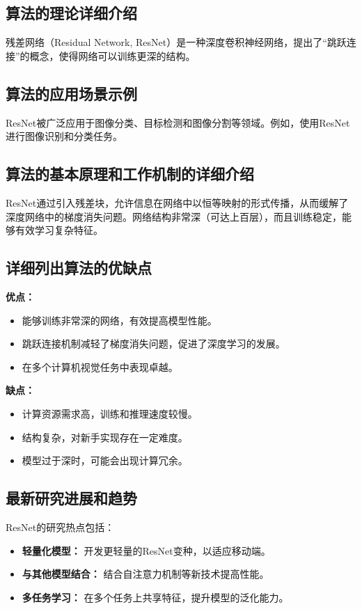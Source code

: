 \subsection*{算法的理论详细介绍}
残差网络（Residual Network, ResNet）是一种深度卷积神经网络，提出了“跳跃连接”的概念，使得网络可以训练更深的结构。

\subsection*{算法的应用场景示例}
ResNet被广泛应用于图像分类、目标检测和图像分割等领域。例如，使用ResNet进行图像识别和分类任务。

\subsection*{算法的基本原理和工作机制的详细介绍}
ResNet通过引入残差块，允许信息在网络中以恒等映射的形式传播，从而缓解了深度网络中的梯度消失问题。网络结构非常深（可达上百层），而且训练稳定，能够有效学习复杂特征。

\subsection*{详细列出算法的优缺点}
\textbf{优点：}
\begin{itemize}
    \item 能够训练非常深的网络，有效提高模型性能。
    \item 跳跃连接机制减轻了梯度消失问题，促进了深度学习的发展。
    \item 在多个计算机视觉任务中表现卓越。
\end{itemize}

\textbf{缺点：}
\begin{itemize}
    \item 计算资源需求高，训练和推理速度较慢。
    \item 结构复杂，对新手实现存在一定难度。
    \item 模型过于深时，可能会出现计算冗余。
\end{itemize}

\subsection*{最新研究进展和趋势}
ResNet的研究热点包括：
\begin{itemize}
    \item \textbf{轻量化模型：} 开发更轻量的ResNet变种，以适应移动端。
    \item \textbf{与其他模型结合：} 结合自注意力机制等新技术提高性能。
    \item \textbf{多任务学习：} 在多个任务上共享特征，提升模型的泛化能力。
\end{itemize}
